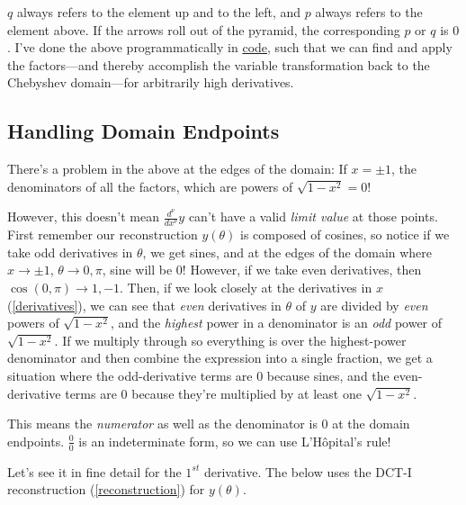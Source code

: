 \documentclass[10pt]{article}
\begin{document}
$q$ always refers to the element up and to the left, and $p$ always refers to the element above. If the arrows roll out of the pyramid, the corresponding $p$ or $q$ is $0$. I've done the above programmatically in \href{https://github.com/pavelkomarov/spectral-derivatives/blob/main/notebooks/alternative_chebyshev_derivative_methods.ipynb}{code}, such that we can find and apply the factors---and thereby accomplish the variable transformation back to the Chebyshev domain---for arbitrarily high derivatives.

\subsection{Handling Domain Endpoints}\label{endpoints}

There's a problem in the above at the edges of the domain: If $x = \pm 1$, the denominators of all the factors, which are powers of $\sqrt{1 - x^2} = 0$!

However, this doesn't mean $\frac{d^\nu}{dx^\nu} y$ can't have a valid \textit{limit value} at those points. First remember our reconstruction $y(\theta)$ is composed of cosines, so notice if we take odd derivatives in $\theta$, we get sines, and at the edges of the domain where $x \rightarrow \pm 1$, $\theta \rightarrow 0,\pi$, sine will be 0! However, if we take even derivatives, then $\cos(0,\pi) \rightarrow 1, -1$. Then, if we look closely at the derivatives in $x$ (\autoref{derivatives}), we can see that \textit{even} derivatives in $\theta$ of $y$ are divided by \textit{even} powers of $\sqrt{1 - x^2}$, and the \textit{highest} power in a denominator is an \textit{odd} power of $\sqrt{1 - x^2}$. If we multiply through so everything is over the highest-power denominator and then combine the expression into a single fraction, we get a situation where the odd-derivative terms are 0 because sines, and the even-derivative terms are 0 because they're multiplied by at least one $\sqrt{1 - x^2}$.

This means the \textit{numerator} as well as the denominator is $0$ at the domain endpoints. $\frac{0}{0}$ is an indeterminate form, so we can use L'Hôpital's rule!

Let's see it in fine detail for the $1^{st}$ derivative. The below uses the DCT-I reconstruction (\autoref{reconstruction}) for $y(\theta)$.
\end{document}

